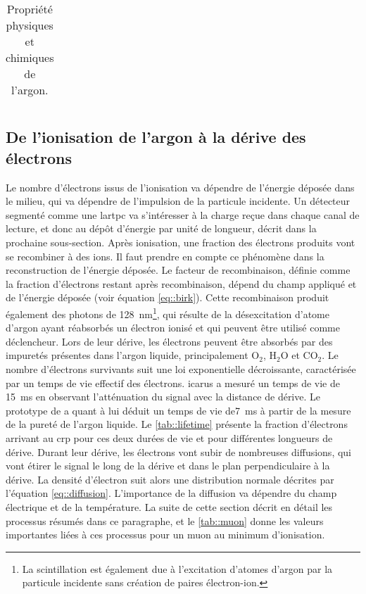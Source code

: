 \begin{table}[htpb]
\begin{tabular}{|l|c|}
        \hline
      \end{tabular}
      \caption{\label{tab::Ar}Propriété physiques et chimiques de l'argon.}
    \end{table}

    \subsection{De l'ionisation de l'argon à la dérive des électrons}\label{sec::ionisation}

        Le nombre d'électrons issus de l'ionisation va dépendre de l'énergie déposée dans le milieu, qui va dépendre de l'impulsion de la particule incidente. Un détecteur segmenté comme une \gls{lartpc} va s'intéresser à la charge reçue dans chaque canal de lecture, et donc au dépôt d'énergie par unité de longueur, décrit dans la prochaine sous-section. Après ionisation, une fraction des électrons produits vont se recombiner à des ions. Il faut prendre en compte ce phénomène dans la reconstruction de l'énergie déposée. Le facteur de recombinaison, définie comme la fraction d'électrons restant après recombinaison, dépend du champ appliqué et de l'énergie déposée (voir équation \eqref{eq::birk}). Cette recombinaison produit également des photons de \SI{128}{\nano\meter}\footnote{La scintillation est également due à l'excitation d'atomes d'argon par la particule incidente sans création de paires électron-ion.}, qui résulte de la désexcitation d'atome d'argon ayant réabsorbés un électron ionisé et qui peuvent être utilisé comme déclencheur. Lors de leur dérive, les électrons peuvent être absorbés par des impuretés présentes dans l'argon liquide, principalement O$_2$, H$_2$O et CO$_2$. Le nombre d'électrons survivants suit une loi exponentielle décroissante, caractérisée par un temps de vie effectif des électrons. \gls{icarus} a mesuré un temps de vie de \SI{15}{\milli\second}\cite{Antonello2014} en observant l'atténuation du signal avec la distance de dérive. Le prototype de \protosp{} a quant à lui déduit un temps de vie de\SI{7}{\milli\second} à partir de la mesure de la pureté de l'argon liquide. Le \autoref{tab::lifetime} présente la fraction d'électrons arrivant au \gls{crp} pour ces deux durées de vie et pour différentes longueurs de dérive. Durant leur dérive, les électrons vont subir de nombreuses diffusions, qui vont étirer le signal le long de la dérive et dans le plan perpendiculaire à la dérive. La densité d'électron suit alors une distribution normale décrites par l'équation \eqref{eq::diffusion}. L'importance de la diffusion va dépendre du champ électrique et de la température. La suite de cette section décrit en détail les processus résumés dans ce paragraphe, et le \autoref{tab::muon} donne les valeurs importantes liées à ces processus pour un muon au minimum d'ionisation. 

